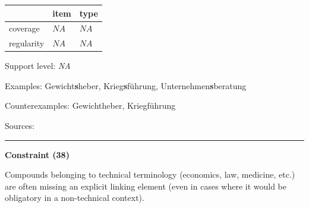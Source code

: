 \vspace{-0.25em}

\begin{table}[!ht]
\begin{center}
\setlength{\extrarowheight}{1pt}
\begin{tabularx}{\columnwidth}{|X|X|X|}
\hline
 & item & type \\
\hline
 coverage & $NA$ & $NA$ \\
\hline
 regularity & $NA$ & $NA$ \\
\hline
\end{tabularx}
\end{center}
\end{table}

\vspace{-1.35em}

\noindent
Support level: \textit{NA}

\vspace{0.3em}

\noindent
Examples: Gewicht\textbf{s}heber, Krieg\textbf{s}führung, Unternehmen\textbf{s}beratung

\noindent
Counterexamples: Gewicht{\zeroLinker}heber, Krieg{\zeroLinker}führung

\vspace{0.3em}

\noindent
Sources: \citet[79]{nuebling_szczepaniak_2013}

\vspace{0.35em}
\hrule




\vspace{0.4em}

\begin{center}
\textbf{Constraint (38)}
\end{center}

\noindent
Compounds belonging to technical terminology (economics, law, medicine, etc.) are often missing an explicit linking element (even in cases where it would be obligatory in a non-technical context).
\vspace{0.5em}


